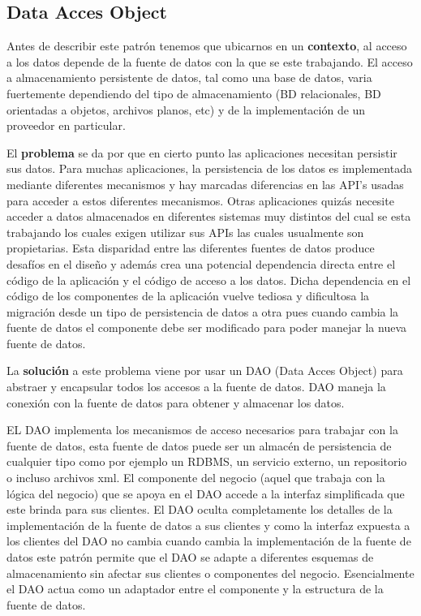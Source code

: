 \subsection{Data Acces Object}\label{jdbgm:dao}
Antes de describir este patrón tenemos que ubicarnos en un \textbf{contexto}, al acceso a los datos depende de la fuente de datos con la que se este trabajando. El acceso a almacenamiento persistente de datos, tal como una base de datos, varia fuertemente dependiendo del tipo de almacenamiento (BD relacionales, BD orientadas a objetos, archivos planos, etc) y de la implementación de un proveedor en particular.

El \textbf{problema} se da por que en cierto punto las aplicaciones necesitan persistir sus datos. Para muchas aplicaciones, la persistencia de los datos es implementada mediante diferentes mecanismos y hay marcadas diferencias en las API's usadas para acceder a estos diferentes mecanismos. Otras aplicaciones quizás necesite acceder a datos almacenados en diferentes sistemas muy distintos del cual se esta trabajando los cuales exigen utilizar sus APIs las cuales usualmente son propietarias. Esta disparidad entre las diferentes fuentes de datos produce desafíos en el diseño y además crea una potencial dependencia directa entre el código de la aplicación y el código de acceso a los datos. Dicha dependencia en el código de los componentes de la aplicación vuelve tediosa y dificultosa la migración desde un tipo de persistencia de datos a otra pues cuando cambia la fuente de datos el componente debe ser modificado para poder manejar la nueva fuente de datos.

La \textbf{solución} a este problema viene por usar un DAO (Data Acces Object) para abstraer y encapsular todos los accesos a la fuente de datos. DAO maneja la conexión con la fuente de datos para obtener y almacenar los datos.

EL DAO implementa los mecanismos de acceso necesarios para trabajar con la fuente de datos, esta fuente de datos puede ser un almacén de persistencia de cualquier tipo como por ejemplo un RDBMS, un servicio externo, un repositorio o incluso archivos xml. El componente del negocio (aquel que trabaja con la lógica del negocio) que se apoya en el DAO accede a la interfaz simplificada que este brinda para sus clientes. El DAO oculta completamente los detalles de la implementación de la fuente de datos a sus clientes y como la interfaz expuesta a los clientes del DAO no cambia cuando cambia la implementación de la fuente de datos este patrón permite que el DAO se adapte a diferentes esquemas de almacenamiento sin afectar sus clientes o componentes del negocio. Esencialmente el DAO actua como un adaptador entre el componente y la estructura de la fuente de datos.

